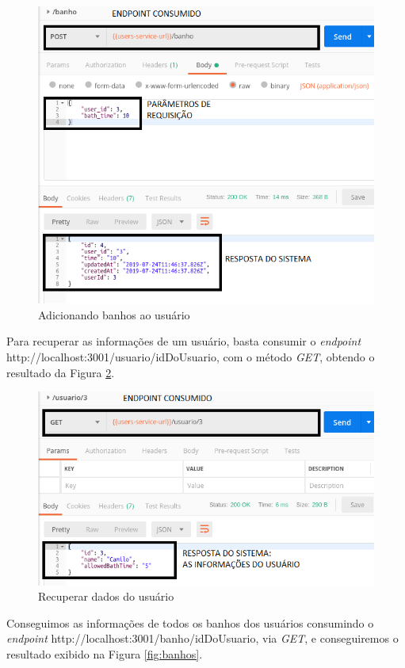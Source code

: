 \begin{figure}[htbp]
	\centering
	\includegraphics[width=0.7\linewidth]{figuras/postman/bathsinclude.png}
	\caption{Adicionando banhos ao usuário}
	\label{fig:banho}
\end{figure}

Para recuperar as informações de um usuário, basta consumir o \textit{endpoint} \break http://localhost:3001/usuario/idDoUsuario, com o método \textit{GET}, obtendo o resultado da Figura \ref{fig:usuario}.

\begin{figure}[htbp]
	\centering
	\includegraphics[width=0.7\linewidth]{figuras/postman/getuser.png}
	\caption{Recuperar dados do usuário}
	\label{fig:usuario}
\end{figure}

Conseguimos as informações de todos os banhos dos usuários consumindo o \textit{endpoint} http://localhost:3001/banho/idDoUsuario, via \textit{GET}, e conseguiremos o resultado exibido na Figura \ref{fig:banhos}.


